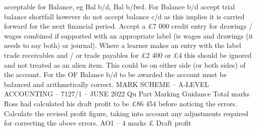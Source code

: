 \documentclass{article}
\begin{document}
acceptable for Balance, eg Bal b/d, Bal b/fwd. For Balance b/d accept trial balance shortfall however do \newline
not accept balance c/d as this implies it is carried forward for the next financial period. \newline
Accept a £7 000 credit entry for drawings / wages combined if supported with an appropriate label (ie \newline
wages and drawings (it needs to say both) or journal).   \newline
 \newline
Where a learner makes an entry with the label trade receivables and / or trade payables for £2 400 or £4  this should be ignored and not treated as an alien item.  This could be on either side (or both sides) \newline
of the account. \newline
 \newline
For the OF Balance b/d to be awarded the account must be balanced and arithmetically correct.  \newline
 \newline
 \newline
 \newline
MARK SCHEME – A-LEVEL ACCOUNTING – 7127/1 – JUNE 2022  \newline
Qu \newline
Part \newline
Marking Guidance \newline
Total \newline
marks   \newline
Ross had calculated his draft profit to be £86 454 before noticing the errors. \newline
 \newline
Calculate the revised profit figure, taking into account any adjustments required \newline
for correcting the above errors.  \newline
 \newline
AO1 – 4 marks \newline
 \newline
  \newline
£ \newline
Draft profit \newline
\end{document}
